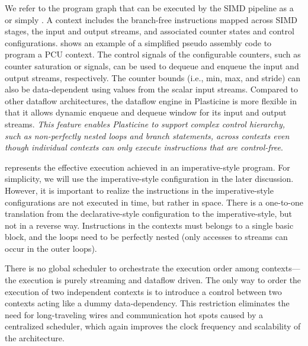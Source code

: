 We refer to the program graph that can be executed by the SIMD pipeline as a  or
simply . 
A context includes the branch-free instructions mapped across SIMD stages, the input and output streams, and associated counter states and control configurations.
 shows an example of a simplified pseudo assembly code to program a PCU context.
The control signals of the configurable counters, such as counter saturation or 
signals, can be used to dequeue and enqueue the input and output streams, respectively.
The counter bounds (i.e., min, max, and stride) can also be data-dependent using values from the scalar input streams. Compared to other dataflow architectures, the dataflow engine in Plasticine is more flexible in that it allows dynamic enqueue and dequeue window for its input and output streams.
\emph{This feature enables Plasticine to support complex control hierarchy, such as non-perfectly nested loops and
branch statements, across contexts even though individual contexts can only execute instructions that are
control-free}. 

 represents the effective execution achieved in an imperative-style program.
For simplicity, we will use the imperative-style configuration in the later discussion.
However, it is important to realize the instructions in the imperative-style configurations are not
executed in time, but rather in space.
There is a one-to-one translation from the declarative-style configuration to the imperative-style, but not in a reverse way.
Instructions in the contexts must belongs to a single basic block, and the loops need to be
perfectly nested (only accesses to streams can occur in the outer loops).

There is no global scheduler to orchestrate the execution order among contexts---the execution is purely
streaming and dataflow driven. 
The only way to order the execution of two independent contexts is to introduce a control  between two contexts acting like a dummy data-dependency.
This restriction eliminates the need for long-traveling wires and communication hot spots caused by a
centralized scheduler, which again improves the clock frequency and scalability of the architecture.

